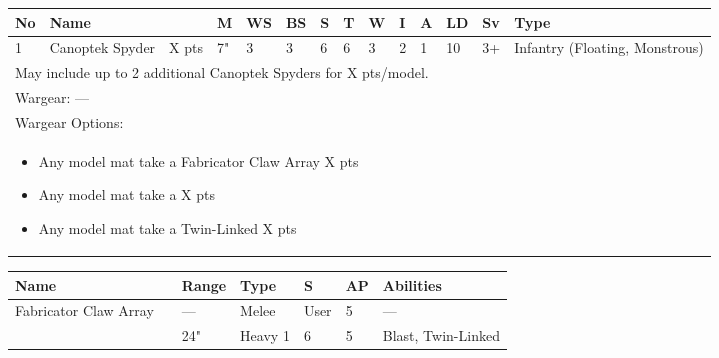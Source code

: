 \noindent
\begin{tabular}{||m{10pt} m{95pt} m{30pt} m{11pt} m{11pt} m{11pt} m{11pt} m{11pt} m{11pt} m{11pt} m{11pt} m{11pt} m{11pt} m{125pt}||}
	\hline
	No & Name & & M & WS & BS & S & T & W & I & A & LD & Sv & Type \\
	\hline
	1 & Canoptek Spyder & X pts & 7" & 3 & 3 & 6 & 6 & 3 & 2 & 1 & 10 & 3+ & Infantry (Floating, Monstrous)\\
	\hline
	\hline
	\multicolumn{14}{||Z{532 pt}||}{May include up to 2 additional Canoptek Spyders for X pts/model.}\\		
	\hline
	\hline
	\multicolumn{14}{||Z{532 pt}||}{Wargear: —}\\
	\multicolumn{14}{||Z{532 pt}||}{Wargear Options:} \\	\multicolumn{14}{||Z{532 pt}||}{\begin{itemize}
			\item Any model mat take a Fabricator Claw Array \hrulefill X pts
			\item Any model mat take a \quickref{Gloom Prism} \hrulefill X pts
			\item Any model mat take a Twin-Linked \quickref{Particle Beamer} \hrulefill X pts
	\end{itemize}} \\
	\hline
\end{tabular}

\noindent
\begin{tabular}{||m{110pt} m{30pt} m{31pt} m{55pt} m{12pt} m{12pt} m{210pt}||}
	\hline
	Name & & Range & Type & S & AP & Abilities \\
	\hline
	Fabricator Claw Array & & — & Melee & User & 5 & — \\
	\quickref{Particle Beamer} & & 24" & Heavy 1 & 6 & 5 & Blast, Twin-Linked \\
	\hline
\end{tabular}

